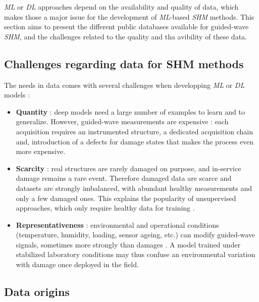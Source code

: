 \documentclass[12pt]{article}
\begin{document}
\textit{ML} or \textit{DL} approaches depend on the availability and quality of data, which makes those a major issue for the development of \textit{ML}-based \textit{SHM} methods. This section aims to present the different public databases available for guided-wave \textit{SHM}, and the challenges related to the quality and tha avibility of these data.
 
\subsection{Challenges regarding data for SHM methods}
 
The needs in data comes with several challenges when developping \textit{ML} or \textit{DL} models \cite{Khatir2025, SPENCER2025100203, s25196136} :
 
\begin{itemize}[itemsep=8pt]
 
    \item \textbf{Quantity} : deep models need a large number of examples to learn and to generalize. However, guided-wave measurements are expensive : each acquisition requires an instrumented structure, a dedicated acquisition chain and, introduction of a defects for damage states that makes the process even more expensive.
 
    \item \textbf{Scarcity} : real structures are rarely damaged on purpose, and in-service damage remains a rare event. Therefore damaged data are scarce and datasets are strongly imbalanced, with abundant healthy measurements and only a few damaged ones. This explains the popularity of unsupervised approaches, which only require healthy data for training \cite{SAWANT2023106931}.
 
    \item \textbf{Representativeness} : environmental and operational conditions (temperature, humidity, loading, sensor ageing, etc.) can modify guided-wave signals, sometimes more strongly than damages \cite{moll2019temperature, Yang2025}. A model trained under stabilized laboratory conditions may thus confuse an environmental variation with damage once deployed in the field.
 
\end{itemize}
 
\subsection{Data origins}
 
\end{document}
